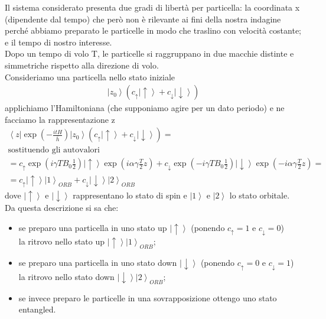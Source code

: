 Il sistema considerato presenta due gradi di libertà per particella: la coordinata x (dipendente dal tempo) che però non è rilevante ai fini della nostra indagine perché abbiamo preparato le particelle in modo che traslino con velocità costante; e il tempo di nostro interesse.\\
Dopo un tempo di volo T, le particelle si raggruppano in due macchie distinte e simmetriche rispetto alla direzione di volo.\\
Consideriamo una particella nello stato iniziale
\begin{equation}\begin{split}
\left|z_{0}\right\rangle (c_{\uparrow}\left|\uparrow\right\rangle+c_{\downarrow}\left|\downarrow\right\rangle)
\end{split}\end{equation}
applichiamo l'Hamiltoniana (che supponiamo agire per un dato periodo) e ne facciamo la rappresentazione z\\
\begin{equation}\begin{split}
\left\langle z\right| \exp (-\frac{itH}{\bar{h}})\left|z_{0}\right\rangle (c_{\uparrow}\left|\uparrow\right\rangle+c_{\downarrow}\left|\downarrow\right\rangle)=\\
\textrm{sostituendo gli autovalori}\\
=c_{\uparrow}\exp(i \gamma T B_{0}\frac{1}{2}) \left|\uparrow\right\rangle \exp(i \alpha \gamma \frac{T}{2}z)+ c_{\downarrow}\exp(-i \gamma T B_{0}\frac{1}{2}) \left|\downarrow\right\rangle \exp(-i \alpha \gamma \frac{T}{2}z)=\\
=c_{\uparrow}\left|\uparrow\right\rangle \left|1\right\rangle_{ORB} + c_{\downarrow}\left|\downarrow\right\rangle \left|2\right\rangle_{ORB}
\end{split}\end{equation}
dove $\left|\uparrow\right\rangle$ e $\left|\downarrow\right\rangle$ rappresentano lo stato di spin e $\left|1\right\rangle$ e $\left|2\right\rangle$ lo stato orbitale.\\
Da questa descrizione si sa che:
\begin{itemize}
\item se preparo una particella in uno stato up $\left|\uparrow\right\rangle$ (ponendo $c_{\uparrow}=1$ e $c_{\downarrow}=0$)\\la ritrovo nello stato up $\left|\uparrow\right\rangle \left|1\right\rangle_{ORB}$;
\item se preparo una particella in uno stato down $\left|\downarrow\right\rangle$ (ponendo $c_{\uparrow}=0$ e $c_{\downarrow}=1$)\\la ritrovo nello stato down $\left|\downarrow\right\rangle \left|2\right\rangle_{ORB}$;
\item se invece preparo le particelle in una sovrapposizione ottengo uno stato entangled.
\end{itemize}
